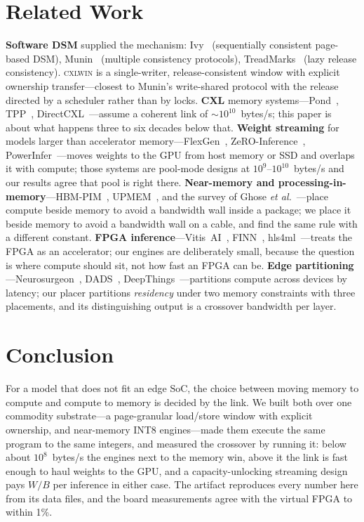 \documentclass[lettersize,journal]{IEEEtran}
\newcommand{\cxlwin}{\textsc{cxlwin}}
\begin{document}
\section{Related Work}
\textbf{Software DSM} supplied the mechanism: Ivy~\cite{ivy} (sequentially consistent page-based DSM), Munin~\cite{munin} (multiple consistency protocols), TreadMarks~\cite{treadmarks} (lazy release consistency). \cxlwin{} is a single-writer, release-consistent window with explicit ownership transfer---closest to Munin's write-shared protocol with the release directed by a scheduler rather than by locks.
\textbf{CXL} memory systems---Pond~\cite{pond_cxl}, TPP~\cite{tpp_cxl}, DirectCXL~\cite{cxl_type2}---assume a coherent link of ${\sim}10^{10}$~bytes/s; this paper is about what happens three to six decades below that.
\textbf{Weight streaming} for models larger than accelerator memory---FlexGen~\cite{flexgen}, ZeRO-Inference~\cite{zero_inference}, PowerInfer~\cite{powerinfer}---moves weights to the GPU from host memory or SSD and overlaps it with compute; those systems are pool-mode designs at $10^9$--$10^{10}$~bytes/s and our results agree that pool is right there.
\textbf{Near-memory and processing-in-memory}---HBM-PIM~\cite{hbm_pim}, UPMEM~\cite{upmem}, and the survey of Ghose \emph{et al.}~\cite{nmc_survey}---place compute beside memory to avoid a bandwidth wall inside a package; we place it beside memory to avoid a bandwidth wall on a cable, and find the same rule with a different constant.
\textbf{FPGA inference}---Vitis~AI~\cite{vitis_ai}, FINN~\cite{finn}, hls4ml~\cite{hls4ml}---treats the FPGA as an accelerator; our engines are deliberately small, because the question is where compute should sit, not how fast an FPGA can be.
\textbf{Edge partitioning}---Neurosurgeon~\cite{neurosurgeon}, DADS~\cite{dads}, DeepThings~\cite{deepthings}---partitions compute across devices by latency; our placer partitions \emph{residency} under two memory constraints with three placements, and its distinguishing output is a crossover bandwidth per layer.

\section{Conclusion}
For a model that does not fit an edge SoC, the choice between moving memory to compute and compute to memory is decided by the link. We built both over one commodity substrate---a page-granular load/store window with explicit ownership, and near-memory INT8 engines---made them execute the same program to the same integers, and measured the crossover by running it: below about $10^8$~bytes/s the engines next to the memory win, above it the link is fast enough to haul weights to the GPU, and a capacity-unlocking streaming design pays $W/B$ per inference in either case. The artifact reproduces every number here from its data files, and the board measurements agree with the virtual FPGA to within 1\%.
\end{document}
